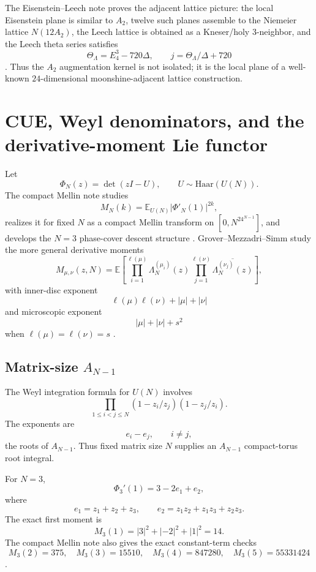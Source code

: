 \documentclass[11pt]{article}
\theoremstyle{remark}
\begin{document}
The Eisenstein--Leech note proves the adjacent lattice picture: the local Eisenstein plane is similar to $A_2$, twelve such planes assemble to the Niemeier lattice $N(12A_2)$, the Leech lattice is obtained as a Kneser/holy 3-neighbor, and the Leech theta series satisfies
\[
        \Theta_\Lambda=E_4^3-720\Delta,
        \qquad
        j=\Theta_\Lambda/\Delta+720
\]
\cite{EisensteinLeechNote}.  Thus the $A_2$ augmentation kernel is not isolated; it is the local plane of a well-known $24$-dimensional moonshine-adjacent lattice construction.

\section{CUE, Weyl denominators, and the derivative-moment Lie functor}

Let
\[
        \Phi_N(z)=\det(zI-U),
        \qquad U\sim\text{Haar}(U(N)).
\]
The compact Mellin note studies
\[
        M_N(k)=\mathbb E_{U(N)}|\Phi'_N(1)|^{2k},
\]
realizes it for fixed $N$ as a compact Mellin transform on $[0,N^24^{N-1}]$, and develops the $N=3$ phase-cover descent structure \cite{CompactMellinPeeling}.  Grover--Mezzadri--Simm study the more general derivative moments
\[
        M_{\mu,\nu}(z,N)=\mathbb E\left[
        \prod_{i=1}^{\ell(\mu)}\Lambda_N^{(\mu_i)}(z)
        \prod_{j=1}^{\ell(\nu)}\overline{\Lambda_N^{(\nu_j)}(z)}
        \right],
\]
with inner-disc exponent
\[
        \ell(\mu)\ell(\nu)+|\mu|+|\nu|
\]
and microscopic exponent
\[
        |\mu|+|\nu|+s^2
\]
when $\ell(\mu)=\ell(\nu)=s$ \cite{GroverMezzadriSimm}.

\subsection{Matrix-size $A_{N-1}$}

The Weyl integration formula for $U(N)$ involves
\[
        \prod_{1\le i<j\le N}(1-z_i/z_j)(1-z_j/z_i).
\]
The exponents are
\[
        e_i-e_j,
        \qquad i\ne j,
\]
the roots of $A_{N-1}$.  Thus fixed matrix size $N$ supplies an $A_{N-1}$ compact-torus root integral.

For $N=3$,
\[
        \Phi_3'(1)=3-2e_1+e_2,
\]
where
\[
        e_1=z_1+z_2+z_3,
        \qquad
        e_2=z_1z_2+z_1z_3+z_2z_3.
\]
The exact first moment is
\[
        M_3(1)=|3|^2+|-2|^2+|1|^2=14.
\]
The compact Mellin note also gives the exact constant-term checks
\[
        M_3(2)=375,
        \quad
        M_3(3)=15510,
        \quad
        M_3(4)=847280,
        \quad
        M_3(5)=55331424
\]
\cite{CompactMellinPeeling}.
\end{document}
